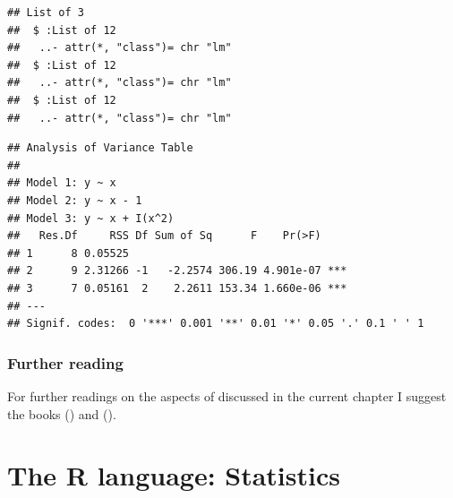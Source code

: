 \documentclass[krantz2]{krantz}\usepackage{knitr}%
\begin{document}
\begin{knitrout}\footnotesize
{}\color{fgcolor}\begin{kframe}
\begin{alltt}
 \hlkwb{<-} \hlstd{()}
 \hlkwb{<-}  \hlopt{~}  \hlopt{~}  \hlopt{-}  \hlopt{~}  \hlopt{+} \hlopt{^}\hlstd{))}
   \hlstd{(} 
    \hlkwb{<-}   
   \hlstd{\}}
  \hlstd{=} \hlstd{)}
\end{alltt}
\begin{verbatim}
## List of 3
##  $ :List of 12
##   ..- attr(*, "class")= chr "lm"
##  $ :List of 12
##   ..- attr(*, "class")= chr "lm"
##  $ :List of 12
##   ..- attr(*, "class")= chr "lm"
\end{verbatim}
\begin{alltt}
\end{alltt}
\begin{verbatim}
## Analysis of Variance Table
## 
## Model 1: y ~ x
## Model 2: y ~ x - 1
## Model 3: y ~ x + I(x^2)
##   Res.Df     RSS Df Sum of Sq      F    Pr(>F)    
## 1      8 0.05525                                  
## 2      9 2.31266 -1   -2.2574 306.19 4.901e-07 ***
## 3      7 0.05161  2    2.2611 153.34 1.660e-06 ***
## ---
## Signif. codes:  0 '***' 0.001 '**' 0.01 '*' 0.05 '.' 0.1 ' ' 1
\end{verbatim}
\end{kframe}
\end{knitrout}

\subsection{Further reading}
For further readings on the aspects of \Rlang discussed in the current chapter I suggest the books  (\citeauthor{Matloff2011}) and  (\citeauthor{Wickham2019}).




\chapter{The R language: Statistics}\label{chap:R:statistics}
\end{document}
